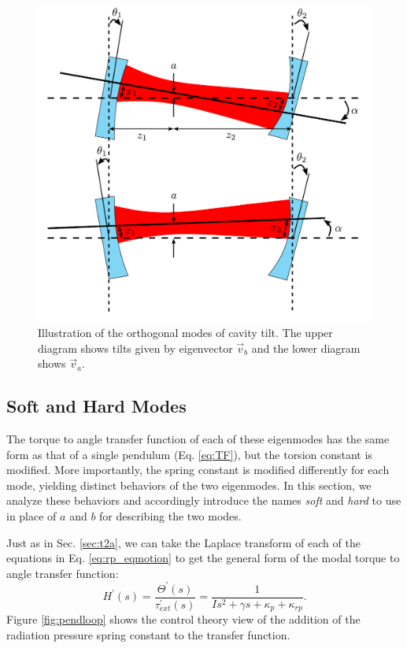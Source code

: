 \begin{figure}
\begin{centering}
\includegraphics[width=0.7\columnwidth]{figures/eigenmodes.pdf}
\caption[Illustration of the orthogonal modes of cavity
tilt]{Illustration of the orthogonal modes of cavity tilt. The upper
  diagram shows tilts given by eigenvector $\vec{v}_b$ and the lower
  diagram shows $\vec{v}_a$.}
\label{fig:ss}
\end{centering}
\end{figure}




\subsection{Soft and Hard Modes} 
The torque to angle transfer function of each of these eigenmodes has
the same form as that of a single pendulum (Eq. \ref{eq:TF}), but the
torsion constant is modified. More importantly, the spring constant is
modified differently for each mode, yielding distinct behaviors of the
two eigenmodes. In this section, we analyze these behaviors and
accordingly introduce the names \emph{soft} and \emph{hard} to use in
place of $a$ and $b$ for describing the two modes.

Just as in Sec. \ref{sec:t2a}, we can take the Laplace transform of
each of the equations in Eq. \ref{eq:rp_eqmotion} to get the general
form of the modal torque to angle transfer function:
\begin{equation}
H^\prime(s) = \frac{\Theta^\prime(s)}{\tau_{ext}^\prime(s)} = \frac{1}{I s^2 + \gamma s +
  \kappa_p + \kappa_{rp}}.
\label{eq:modalTF}
\end{equation} 
Figure \ref{fig:pendloop} shows the control theory view of
the addition of the radiation pressure spring constant to the transfer
function.

